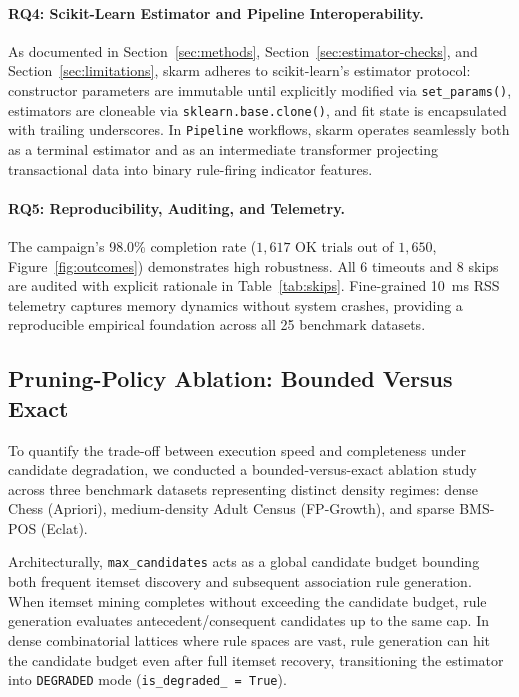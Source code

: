 \documentclass[journal,a4paper]{IEEEtran}
\newcommand{\skarm}{skarm\xspace}
\begin{document}
\paragraph{RQ4: Scikit-Learn Estimator and Pipeline Interoperability.} As documented in Section~\ref{sec:methods}, Section~\ref{sec:estimator-checks}, and Section~\ref{sec:limitations}, \skarm adheres to scikit-learn's estimator protocol: constructor parameters are immutable until explicitly modified via \texttt{set\_params()}, estimators are cloneable via \texttt{sklearn.base.clone()}, and fit state is encapsulated with trailing underscores. In \texttt{Pipeline} workflows, \skarm operates seamlessly both as a terminal estimator and as an intermediate transformer projecting transactional data into binary rule-firing indicator features.

\paragraph{RQ5: Reproducibility, Auditing, and Telemetry.} The campaign's 98.0\% completion rate ($1{,}617$ OK trials out of $1{,}650$, Figure~\ref{fig:outcomes}) demonstrates high robustness. All 6 timeouts and 8 skips are audited with explicit rationale in Table~\ref{tab:skips}. Fine-grained 10~ms RSS telemetry captures memory dynamics without system crashes, providing a reproducible empirical foundation across all 25 benchmark datasets.

\subsection{Pruning-Policy Ablation: Bounded Versus Exact}
\label{sec:ablation}
To quantify the trade-off between execution speed and completeness under candidate degradation, we conducted a bounded-versus-exact ablation study across three benchmark datasets representing distinct density regimes: dense Chess (Apriori), medium-density Adult Census (FP-Growth), and sparse BMS-POS (Eclat).

Architecturally, \texttt{max\_candidates} acts as a global candidate budget bounding both frequent itemset discovery and subsequent association rule generation. When itemset mining completes without exceeding the candidate budget, rule generation evaluates antecedent/consequent candidates up to the same cap. In dense combinatorial lattices where rule spaces are vast, rule generation can hit the candidate budget even after full itemset recovery, transitioning the estimator into \texttt{DEGRADED} mode (\texttt{is\_degraded\_ = True}).
\end{document}
